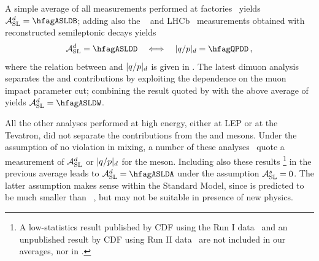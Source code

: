 A simple average of all measurements performed at 
\B factories~\cite{Behrens:2000qu,Jaffe:2001hz,*Jaffe:2001hz_cont,Aubert:2003hd,*Aubert:2004xga_mod_cont,Aubert:2006nf,*Aubert:2002mn_mod_cont,Lees:2013sua,*Margoni:2013qx,*Aubert:2006sa_mod,Nakano:2005jb}
yields $\ASLd = \hfagASLDB$; adding also the \dzero~\cite{Abazov:2012uia}
and LHCb~\cite{Aaij:2014nxa} measurements obtained with reconstructed 
semileptonic \Bd decays yields
\begin{equation}
\ASLd = \hfagASLDD  ~~~ \Longleftrightarrow ~~~ |q/p|_{\particle{d}} = \hfagQPDD \,,
\labe{ASLDD}
\end{equation}
where the relation between \ASLd and $|q/p|_{d}$ is given in .
The latest dimuon \dzero analysis~\cite{Abazov:2013uma,*Abazov:2011yk_mod,*Abazov:2010hv_mod_cont,*Abazov:2010hj_mod_cont,*Abazov:2011yk_cont}
separates the \Bd and \Bs contributions by exploiting the dependence on the muon impact parameter cut; combining the 
\ASLd result quoted by \dzero with the above \Bd average of  yields
$\ASLd = \hfagASLDW$. %

All the other \Bd analyses performed at high energy, either at LEP or at the Tevatron,
did not separate the contributions from the \Bd and \Bs mesons.
Under the assumption of no \CP violation in \Bs mixing, a number of 
these analyses~\cite{Abazov:2006qw,Ackerstaff:1997vd,Barate:2000uk,Abbiendi:1998av}
quote a measurement of ${\cal A}_{\rm SL}^d$ or $|q/p|_{d}$ for the \Bd meson. Including also 
these results%
\footnote{
  \label{foot:life_mix:Abe:1996zt}
  A low-statistics result published by CDF using the Run I data~\cite{Abe:1996zt} and 
an unpublished result by CDF using Run II data~\cite{CDFnote9015:2007} 
are not included in our averages, nor in .}
in the previous average %
leads to 
$\ASLd = \hfagASLDA$ %
under the assumption ${\cal A}_{\rm SL}^s =0$. The latter assumption makes sense within the Standard Model, 
since \ASLs is predicted to be much smaller than \ASLd~\cite{Lenz:2011ti,*Lenz:2006hd}, but may not be suitable in presence of new physics. 

